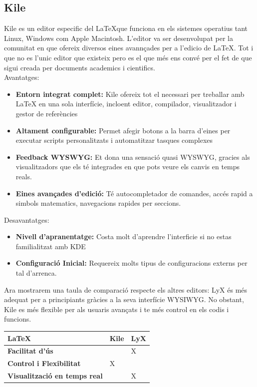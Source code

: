 \subsection{Kile}
Kile es un editor especific del \LaTeX que funciona en els sistemes operatius tant Linux, Windows com Apple Macintosh. L'editor va ser desenvolupat per la comunitat   en que ofereix diversos eines avannçades per a l'edicio de LaTeX. Tot i que no es l'unic editor que existeix pero es el que més ens convé per el fet de que sigui creada per documents academics i cientifics.\\

Avantatges:
\begin{itemize}
\item \textbf{Entorn integrat complet:} Kile ofereix tot el necessari per treballar amb LaTeX en una sola interfície, incloent editor, compilador, visualitzador i gestor de referències
\item \textbf{Altament configurable: } Permet afegir botons a la barra d'eines per executar scripts personalitzats i automatitzar tasques complexes
\item \textbf{Feedback WYSWYG:} Et dona una sensació quasi WYSWYG, gracies als visualitzadors que els té integrades en que pots veure els canvis en temps reals.
\item \textbf{Eines avançades d'edició:} Té autocompletador de comandes, accés rapid a simbols matematics, navegacions rapides per seccions.
\end{itemize}
Desavantatges:
\begin{itemize}
\item \textbf{Nivell d'apranentatge:} Costa molt d'aprendre l'interficie si no estas familialitzat amb KDE
\item \textbf{Configuració Inicial:} Requereix molts tipus de configuracions externs per tal d'arrenca.
\end{itemize}

Ara mostrarem una taula de comparació respecte els altres editors:
LyX és més adequat per a principiants gràcies a la seva interfície WYSIWYG. No obstant, Kile es més flexible per als usuaris avançats i te més control en els codis i funcions. \\
\begin{table}[h!]
 \begin{tabular}{|l|l|l|}
\hline
 \LaTeX & \textbf{Kile} & \textbf{LyX} \\ \hline
 \textbf{Facilitat d'ús} &  & X \\ \hline
 \textbf{Control i Flexibilitat} & X & \\ \hline
 \textbf{Visualització en temps real} & & X \\ \hline
\end{tabular}
\end{table}

